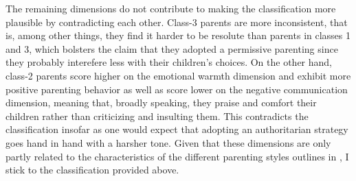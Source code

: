 The remaining dimensions do not contribute to making the classification more plausible by contradicting each other. Class-3 parents are more inconsistent, that is, among other things, they find it harder to be resolute than parents in classes 1 and 3, which bolsters the claim that they adopted a permissive parenting since they probably interefere less with their children's choices. On the other hand, class-2 parents score higher on the emotional warmth dimension and exhibit more positive parenting behavior as well as score lower on the negative communication dimension, meaning that, broadly speaking, they praise and comfort their children rather than criticizing and insulting them. This contradicts the classification insofar as one would expect that adopting an authoritarian strategy goes hand in hand with a harsher tone. Given that these dimensions are only partly related to the characteristics of the different parenting styles outlines in \textcite{doepkeEconomicsParenting2019}, I stick to the classification provided above.
%
%
